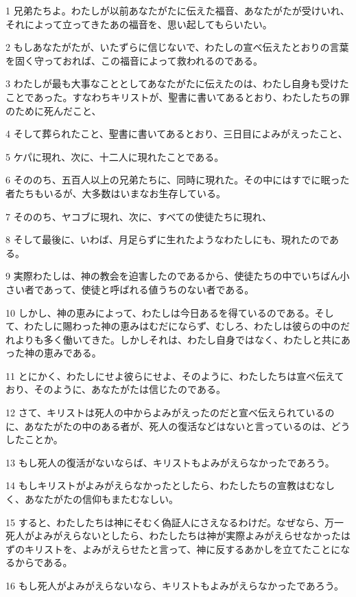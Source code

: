 \par 1 兄弟たちよ。わたしが以前あなたがたに伝えた福音、あなたがたが受けいれ、それによって立ってきたあの福音を、思い起してもらいたい。
\par 2 もしあなたがたが、いたずらに信じないで、わたしの宣べ伝えたとおりの言葉を固く守っておれば、この福音によって救われるのである。
\par 3 わたしが最も大事なこととしてあなたがたに伝えたのは、わたし自身も受けたことであった。すなわちキリストが、聖書に書いてあるとおり、わたしたちの罪のために死んだこと、
\par 4 そして葬られたこと、聖書に書いてあるとおり、三日目によみがえったこと、
\par 5 ケパに現れ、次に、十二人に現れたことである。
\par 6 そののち、五百人以上の兄弟たちに、同時に現れた。その中にはすでに眠った者たちもいるが、大多数はいまなお生存している。
\par 7 そののち、ヤコブに現れ、次に、すべての使徒たちに現れ、
\par 8 そして最後に、いわば、月足らずに生れたようなわたしにも、現れたのである。
\par 9 実際わたしは、神の教会を迫害したのであるから、使徒たちの中でいちばん小さい者であって、使徒と呼ばれる値うちのない者である。
\par 10 しかし、神の恵みによって、わたしは今日あるを得ているのである。そして、わたしに賜わった神の恵みはむだにならず、むしろ、わたしは彼らの中のだれよりも多く働いてきた。しかしそれは、わたし自身ではなく、わたしと共にあった神の恵みである。
\par 11 とにかく、わたしにせよ彼らにせよ、そのように、わたしたちは宣べ伝えており、そのように、あなたがたは信じたのである。
\par 12 さて、キリストは死人の中からよみがえったのだと宣べ伝えられているのに、あなたがたの中のある者が、死人の復活などはないと言っているのは、どうしたことか。
\par 13 もし死人の復活がないならば、キリストもよみがえらなかったであろう。
\par 14 もしキリストがよみがえらなかったとしたら、わたしたちの宣教はむなしく、あなたがたの信仰もまたむなしい。
\par 15 すると、わたしたちは神にそむく偽証人にさえなるわけだ。なぜなら、万一死人がよみがえらないとしたら、わたしたちは神が実際よみがえらせなかったはずのキリストを、よみがえらせたと言って、神に反するあかしを立てたことになるからである。
\par 16 もし死人がよみがえらないなら、キリストもよみがえらなかったであろう。
